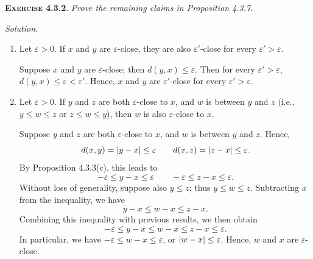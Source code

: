 \documentclass[12pt]{article}
\theoremstyle{remark}
\newenvironment{exer}[2]{
    \noindent \setlength{\parskip}{1em}%
    \textsc{\textbf{Exercise #1}}. \textit{#2} \par
    \noindent \textit{Solution.} %
}{\bigskip}
\begin{document}
\begin{exer}{4.3.2}{
    Prove the remaining claims in Proposition 4.3.7.
}
\begin{enumerate}[topsep=0mm,label=(\alph*)]
            Suppose $x$ and $y$ are $\varepsilon$-close, and $z$ and $w$ are $\delta$-close.
            Then $d(x, y) \le \varepsilon$, $d(z, w) \le \delta$.
            We have
            \[
                d(x + z, y + w) = \abs{(x + z) - (y + w)} = \abs{(x - y) + (z - w)}.
            \]
            From Proposition 4.3.3(b), this is no more than
            \[
                \abs{x - y} + \abs{z - w} \le \varepsilon + \delta.
            \]
            Therefore, $x + z$ and $y + w$ are $(\varepsilon + \delta)$-close.

            Similarly, we have
            \[
                d(x - z, y - w) = \abs{(x - z) - (y - w)} = \abs{(x - y) + (w - z)}.
            \]
            From Proposition 4.3.3(b), this is no more than
            \[
                \abs{x - y} + \abs{z - w} = \abs{x - y} + \abs{w - z} \le \varepsilon + \delta.
            \]
            Therefore, $x - z$ and $y - w$ are $(\varepsilon + \delta)$-close.

        \item Let $\varepsilon > 0$. If $x$ and $y$ are $\varepsilon$-close, they are also $\varepsilon'$-close for every $\varepsilon' > \varepsilon$.

            Suppose $x$ and $y$ are $\varepsilon$-close; then $d(y, x) \le \varepsilon$.
            Then for every $\varepsilon' > \varepsilon$, $d(y, x) \le \varepsilon < \varepsilon'$.
            Hence, $x$ and $y$ are $\varepsilon'$-close for every $\varepsilon' > \varepsilon$.

        \item Let $\varepsilon > 0$. If $y$ and $z$ are both $\varepsilon$-close to $x$, and $w$ is between $y$ and $z$ (i.e., $y \le w \le z$ or $z \le w \le y$), then $w$ is also $\varepsilon$-close to $x$.

            Suppose $y$ and $z$ are both $\varepsilon$-close to $x$, and $w$ is between $y$ and $z$.
            Hence,
            \[
                d(x, y) = \abs{y - x} \le \varepsilon \qquad d(x, z) = \abs{z - x} \le \varepsilon.
            \]
            By Proposition 4.3.3(c), this leads to
            \[
                -\varepsilon \le y - x \le \varepsilon \qquad -\varepsilon \le z - x \le \varepsilon.
            \]
            Without loss of generality, suppose also $y \le z$; thus $y \le w \le z$.
            Subtracting $x$ from the inequality, we have
            \[
                y - x \le w - x \le z - x.
            \]
            Combining this inequality with previous results, we then obtain
            \[
                -\varepsilon \le y - x \le w - x \le z - x \le \varepsilon.
            \]
            In particular, we have $-\varepsilon \le w - x \le \varepsilon$, or $\abs{w - x} \le \varepsilon$.
            Hence, $w$ and $x$ are $\varepsilon$-close.
            

\end{enumerate}
\end{exer}
\end{document}
